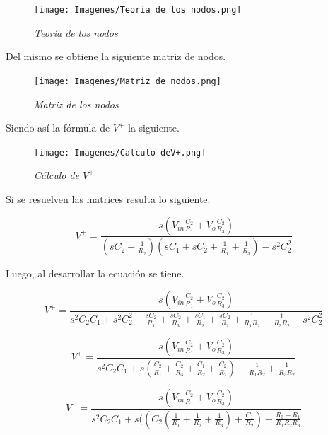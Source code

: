 \documentclass[12pt,A4paper,titlepage]{article}
\begin{document}
\newpage
\begin{figure}[!h] 
  \centering
  \texttt{[image: Imagenes/Teoria de los nodos.png]}
  \caption{\textit{Teoría de los nodos}}
\end{figure}

\bigskip
\hspace{1mm} Del mismo se obtiene la siguiente matriz de nodos.

\begin{figure}[!h] 
  \centering
  \texttt{[image: Imagenes/Matriz de nodos.png]}
  \caption{\textit{Matriz de los nodos}}
\end{figure}

\bigskip
\hspace{1mm} Siendo así la fórmula de \(V^+\) la siguiente.

\begin{figure}[!h] 
  \centering
  \texttt{[image: Imagenes/Calculo deV+.png]}
  \caption{\textit{Cálculo de \(V^+\)}}
\end{figure}

\newpage
\hspace{1mm} Si se resuelven las matrices resulta lo siguiente.

\begin{equation}
    V^+ = \frac{s (V_{in}\frac{C_2}{R_1} + V_o \frac{C_2}{R_3}) }{(s C_2 + \frac{1}{R_2}) (sC_1 + sC_2 + \frac{1}{R_1} + \frac{1}{R_3}) - s^2 C_2^2} 
\end{equation}

\bigskip
\hspace{1mm} Luego, al desarrollar la ecuación se tiene.

\begin{equation}
    V^+ = \frac{s (V_{in}\frac{C_2}{R_1} + V_o \frac{C_2}{R_3}) }{s^2 C_2 C_1 + s^2 C_2^2 + \frac{sC_2}{R_1} + \frac{sC_2}{R_3} + \frac{sC_1}{R_2} + \frac{sC_2}{R_2} + \frac{1}{R_1 R_2} + \frac{1}{R_3 R_2} - s^2 C_2^2} 
\end{equation}

\bigskip
\begin{equation}
    V^+ = \frac{s (V_{in}\frac{C_2}{R_1} + V_o \frac{C_2}{R_3}) }{s^2 C_2 C_1  + s(\frac{C_2}{R_1} + \frac{C_2}{R_3} + \frac{C_1}{R_2} + \frac{C_2}{R_2}) + \frac{1}{R_1 R_2} + \frac{1}{R_3 R_2}} 
\end{equation}

\bigskip
\begin{equation}
    V^+ = \frac{s (V_{in}\frac{C_2}{R_1} + V_o \frac{C_2}{R_3})}{s^2 C_2 C_1  + s((C_2(\frac{1}{R_1} + \frac{1}{R_2} + \frac{1}{R_3}) + \frac{C_1}{R_2})  + \frac{R_3 + R_1}{R_1 R_2 R_3}} 
\end{equation}
\end{document}
